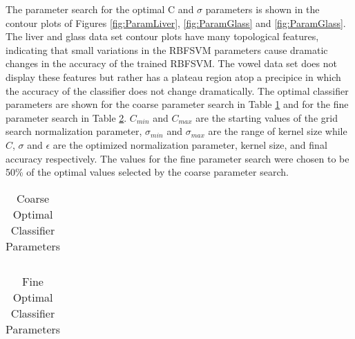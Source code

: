 The parameter search for the optimal C and $\sigma$ parameters is shown in the contour plots of Figures \ref{fig:ParamLiver}, \ref{fig:ParamGlass} and \ref{fig:ParamGlass}.
The liver and glass data set contour plots have many topological features, indicating that small variations in the RBFSVM parameters cause dramatic changes in the accuracy of the trained RBFSVM.
The vowel data set does not display these features but rather has a plateau region atop a precipice in which the accuracy of the classifier does not change dramatically.
The optimal classifier parameters are shown for the coarse parameter search in Table \ref{tab:CoarseParamValues} and for the fine parameter search in Table \ref{tab:FineParamValues}. $C_{min}$ and $C_{max}$ are the starting values of the grid search normalization parameter, $\sigma_{min}$ and $\sigma_{max}$ are the range of kernel size while $C$, $\sigma$ and $\epsilon$ are the optimized normalization parameter, kernel size, and final accuracy respectively.
The values for the fine parameter search were chosen to be 50\% of the optimal values selected by the coarse parameter search.
\begin{table}[h!]
\caption{Coarse Optimal Classifier Parameters}
\label{tab:CoarseParamValues}
\centering
\begin{tabular}{c c c c c c c c}
\hline

\hline
\end{tabular}
\end{table}
\begin{table}[!ht]
\caption{Fine Optimal Classifier Parameters}
\label{tab:FineParamValues}
\centering
\begin{tabular}{c c c c c c c c}
\hline

\hline
\end{tabular}
\end{table}

